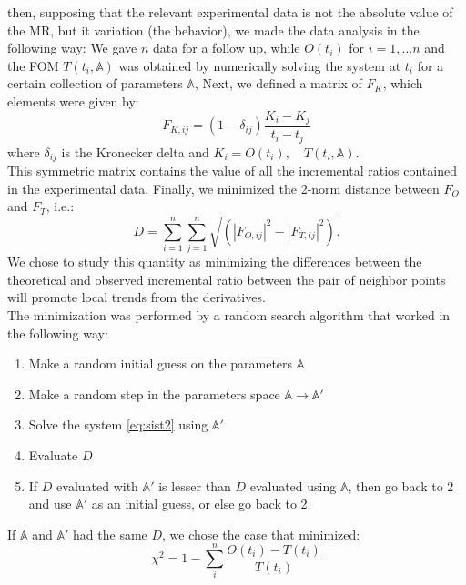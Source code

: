 \documentclass[a4paper,10pt]{article}
\begin{document}
then, supposing that the relevant experimental data is not the absolute value of 
the MR, but it variation (the behavior), we made the data analysis in the following way:
We gave  $n$ data for a follow up, while
$O(t_i)$ for $i=1,\dots n$ and the FOM $T(t_i, \mathbb{A})$ 
 was obtained by numerically solving the system at $t_i$ for a certain collection 
of parameters $\mathbb{A} $, 
Next, we defined a matrix of $F_K$, which elements were given by:
\begin{equation}
F_{K,ij}=(1-\delta_{ij})\frac{K_i-K_j}{t_i-t_j}
\end{equation}
where $\delta_{ij}$ is the Kronecker delta and $K_{i}=O(t_i), \quad T(t_i, \mathbb{A})$.\\
This symmetric matrix contains the value of all the incremental ratios contained in the experimental data.
Finally, we minimized the 2-norm distance between $F_{O}$ and $ F_{T}$, i.e.:
\begin{equation}
D=\sum_{i=1}^n\sum_{j=1}^n\sqrt{(|F_{O,ij}|^2- |F_{T,ij}|^2)}.
\end{equation}
We chose to study this quantity as minimizing the differences between the theoretical
and observed incremental ratio between the pair of neighbor points will promote local trends 
from the derivatives.\\
The minimization was performed by a random search algorithm that worked in the following way:
\begin{enumerate}
\item Make a random initial guess on the parameters $\mathbb{A}$ 
\item Make a random step in the parameters space $\mathbb{A}\longrightarrow\mathbb{A}'$
\item Solve the system \eqref{eq:sist2} using $\mathbb{A}'$
\item Evaluate $D$
\item If $D$ evaluated with $\mathbb{A}'$ is lesser than $D$ evaluated using $\mathbb{A}$,
then go back to 2 and use $\mathbb{A}'$ as an initial guess, or else go back to 2. 
\end{enumerate}
If $\mathbb{A}$ and $\mathbb{A}'$ had the same $D$, we chose the case that minimized:
\begin{equation}
\chi^2=1-\sum_{i}^n\frac{O(t_i)-T(t_i)}{T(t_i)}
\end{equation}
\end{document}
